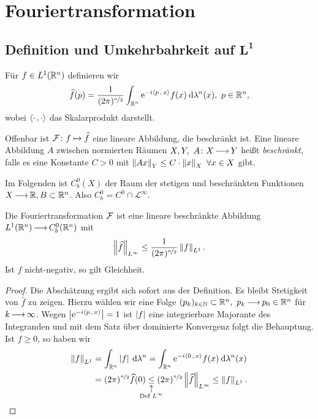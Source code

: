 \documentclass[skript.tex]{subfiles}
\begin{document}
\chapter{Fouriertransformation}
\setcounter{cntr}{0}
\section{Definition und Umkehrbahrkeit auf $\boldsymbol{L^1}$}
\begin{defin}[Fouriertransformation]
	Für $f \in L^1(\mathbb{R}^n)$ definieren wir
	\[
		\widehat{f}(p) = \frac{1}{(2\pi)^{\nicefrac{n}{2}}} \int_{\mathbb{R}^n} \mathrm{e}^{-i \langle p\,{,}\,x \rangle} f(x) \: \mathrm{d} \lambda^n(x),\ p\in \mathbb{R}^n,
	\]
	wobei $\langle \cdot\,{,}\,\cdot \rangle$ das Skalarprodukt darstellt.
\end{defin}
Offenbar ist $\mathcal{F}\colon f \mapsto \widehat{f}$ eine lineare Abbildung, die beschränkt ist. Eine lineare Abbildung $A$ zwischen normierten Räumen $X,Y,\ A\colon X \kern -1pt \longrightarrow \kern -1pt Y$ heißt \textit{beschränkt}, falls es eine Konstante $C>0$ mit $\norm{Ax}_Y \leq C\cdot \norm{x}_X\ \forall x \in X$ gibt. 

Im Folgenden ist $C^0_b(X)$ der Raum der stetigen und beschränkten Funktionen $X\kern -1pt \longrightarrow \kern -1pt \mathbb{R}, B \subset \mathbb{R}^n$. Also $C^0_b = C^0 \cap \mathscr{L}^\infty$.

\begin{lem}
	Die Fouriertransformation $\mathcal{F}$ ist eine lineare beschränkte Abbildung $L^1({\mathbb{R}^n})  \kern -1pt \longrightarrow \kern -1pt C^0_b({\mathbb{R}^n})$ mit
	\[
		\left\lVert \widehat{f} \right\rVert_{L^\infty} \leq \frac{1}{(2\pi)^{\nicefrac{n}{2}}} \left\lVert f \right\rVert_{L^1}.
	\] 
	Ist $f$ nicht-negativ, so gilt Gleichheit. %
\end{lem}

\begin{proof}
	Die Abschätzung ergibt sich sofort aus der Definition. Es bleibt Stetigkeit von $\widehat{f}$ zu zeigen. Hierzu wählen wir eine Folge $(p_k)_{k\in\mathbb{N}} \subset {\mathbb{R}^n},\ p_k \kern -1pt \longrightarrow \kern -1pt p_0 \in {\mathbb{R}^n}$ für $k\kern -1pt \longrightarrow \kern -1pt\infty$. Wegen $\left| \mathrm{e}^{-i \langle p\,{,}\,x \rangle} \right|=1$ ist $\left| f \right|$ eine integrierbare Majorante des Integranden und mit dem Satz über dominierte Konvergenz folgt die Behauptung. Ist $f\geq0$, so haben wir 
	\begin{align*}
		\norm{f}_{L^1} &= \int_\Rn \abs{f} \md \lambda^n = \int_{\Rn} \e^{-i \skp{0}{x}} f(x) \md \lambda^n(x)\\
		&= (2\pi)^{\nicefrac{n}{2}} \widehat{f}(0) \uarrow{\text{Def }L^\infty}{\leq} (2\pi)^{\nicefrac{n}{2}} \norm{\widehat{f}}_{L^\infty} \leq \norm{f}_{L^1}.
	\end{align*}
\end{proof}
\end{document}

